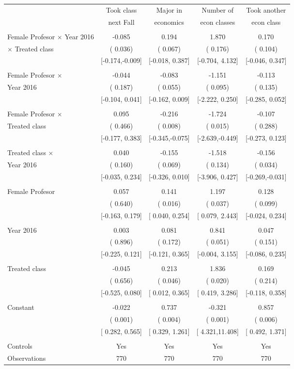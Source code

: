 \begin{tabular}{lcccc} \toprule
& Took class  & Major in & Number of  & Took another\tabularnewline
& next Fall  & economics  & econ classes & econ class \tabularnewline \midrule
&  &  &  & \tabularnewline
Female Profesor $\times$ Year 2016 & -0.085 &  0.194 &  1.870 &  0.170\tabularnewline
$\times$ Treated class  & ( 0.036) & ( 0.067) & ( 0.176) & ( 0.104)\tabularnewline
& {[}-0.174,-0.009{]} & {[}-0.018, 0.387{]} & {[}-0.704, 4.132{]} & {[}-0.046, 0.347{]}\tabularnewline
&  &  &  & \tabularnewline
Female Profesor $\times$  & -0.044 & -0.083 & -1.151 & -0.113\tabularnewline
Year 2016  & ( 0.187) & ( 0.055) & ( 0.095) & ( 0.135)\tabularnewline
& {[}-0.104, 0.041{]} & {[}-0.162, 0.009{]} & {[}-2.222, 0.250{]} & {[}-0.285, 0.052{]}\tabularnewline
&  &  &  & \tabularnewline
Female Profesor $\times$ &  0.095 & -0.216 & -1.724 & -0.107\tabularnewline
Treated class & ( 0.466) & ( 0.008) & ( 0.015) & ( 0.288)\tabularnewline
& {[}-0.177, 0.383{]} & {[}-0.345,-0.075{]} & {[}-2.639,-0.449{]} & {[}-0.273, 0.123{]}\tabularnewline
&  &  &  & \tabularnewline
Treated class $\times$ &  0.040 & -0.155 & -1.518 & -0.156\tabularnewline
Year 2016 & ( 0.160) & ( 0.069) & ( 0.134) & ( 0.034)\tabularnewline
& {[}-0.035, 0.234{]} & {[}-0.326, 0.010{]} & {[}-3.906, 0.427{]} & {[}-0.269,-0.031{]}\tabularnewline
&  &  &  & \tabularnewline
Female Profesor &  0.057 &  0.141 &  1.197 &  0.128\tabularnewline
& ( 0.640) & ( 0.016) & ( 0.037) & ( 0.099)\tabularnewline
& {[}-0.163, 0.179{]} & {[} 0.040, 0.254{]} & {[} 0.079, 2.443{]} & {[}-0.024, 0.234{]}\tabularnewline
&  &  &  & \tabularnewline
Year 2016 &  0.003 &  0.081 &  0.841 &  0.047\tabularnewline
& ( 0.896) & ( 0.172) & ( 0.051) & ( 0.151)\tabularnewline
& {[}-0.225, 0.121{]} & {[}-0.121, 0.365{]} & {[}-0.004, 3.155{]} & {[}-0.086, 0.235{]}\tabularnewline
&  &  &  & \tabularnewline
Treated class & -0.045 &  0.213 &  1.836 &  0.169\tabularnewline
& ( 0.656) & ( 0.046) & ( 0.020) & ( 0.214)\tabularnewline
& {[}-0.525, 0.080{]} & {[} 0.012, 0.365{]} & {[} 0.419, 3.286{]} & {[}-0.118, 0.358{]}\tabularnewline
&  &  &  & \tabularnewline
Constant  & -0.022 &  0.737 & -0.321 &  0.857\tabularnewline
& ( 0.001) & ( 0.004) & ( 0.001) & ( 0.006)\tabularnewline
& {[} 0.282, 0.565{]} & {[} 0.329, 1.261{]} & {[} 4.321,11.408{]} & {[} 0.492, 1.371{]}\tabularnewline
&  &  &  & \tabularnewline
Controls & Yes & Yes & Yes & Yes \tabularnewline
Observations & 770 & 770 & 770 & 770\tabularnewline
\bottomrule \bottomrule
\end{tabular}
